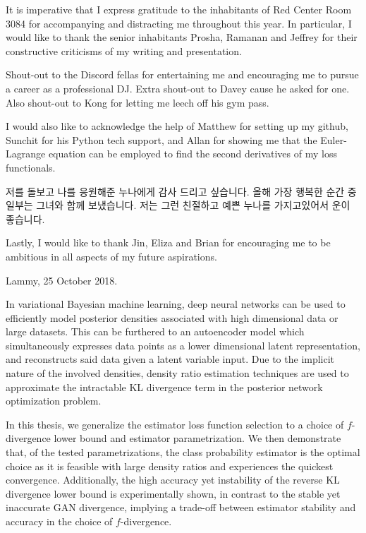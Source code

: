 \documentclass[honours,12pt, twoside]{unswthesis}
\numberwithin{equation}{section}
\theoremstyle{definition}
\begin{document}
{\bigskip\noindent}It is imperative that I express gratitude to the inhabitants of Red Center Room 3084 for accompanying and distracting me throughout this year. In particular, I would like to thank the senior inhabitants Prosha, Ramanan and Jeffrey for their constructive criticisms of my writing and presentation.

{\bigskip\noindent}Shout-out to the Discord fellas for entertaining me and encouraging me to pursue a career as a professional DJ. Extra shout-out to Davey cause he asked for one. Also shout-out to Kong for letting me leech off his gym pass.

{\bigskip\noindent}I would also like to acknowledge the help of Matthew for setting up my github, Sunchit for his Python tech support, and Allan for showing me that the Euler-Lagrange equation can be employed to find the second derivatives of my loss functionals.

{\bigskip\noindent}저를 돌보고 나를 응원해준 누나에게 감사 드리고 싶습니다. 올해 가장 행복한 순간 중 일부는 그녀와 함께 보냈습니다. 저는 그런 친절하고 예쁜 누나를 가지고있어서 운이 좋습니다.

{\bigskip\noindent}Lastly, I would like to thank Jin, Eliza and Brian for encouraging me to be ambitious in all aspects of my future aspirations.

{\bigskip\bigskip\bigskip\noindent}Lammy, 25 October 2018.

\afterpage{\cleardoublepage}


In variational Bayesian machine learning, deep neural networks can be used to efficiently model posterior densities associated with high dimensional data or large datasets. This can be furthered to an autoencoder model which simultaneously expresses data points as a lower dimensional latent representation, and reconstructs said data given a latent variable input. Due to the implicit nature of the involved densities, density ratio estimation techniques are used to approximate the intractable KL divergence term in the posterior network optimization problem. 

In this thesis, we generalize the estimator loss function selection to a choice of $f$-divergence lower bound and estimator parametrization. We then demonstrate that, of the tested parametrizations, the class probability estimator is the optimal choice as it is feasible with large density ratios and experiences the quickest convergence. Additionally, the high accuracy yet instability of the reverse KL divergence lower bound is experimentally shown, in contrast to the stable yet inaccurate GAN divergence, implying a trade-off between estimator stability and accuracy in the choice of $f$-divergence.
\afterpage{\clearpage}
\end{document}
